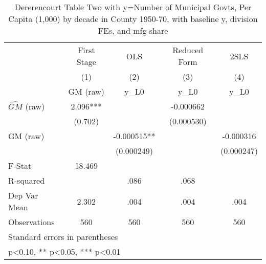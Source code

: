 \begin{table}[htbp]\centering
\def\sym#1{\ifmmode^{#1}\else\(^{#1}\)\fi}
\caption{Dererencourt Table Two with y=Number of Municipal Govts, Per Capita (1,000) by decade in County 1950-70, with baseline y, division FEs, and mfg share}
\begin{tabular}{l*{4}{c}}
\toprule
                    & First Stage   &         OLS   &Reduced Form   &        2SLS   \\
                    &\multicolumn{1}{c}{(1)}&\multicolumn{1}{c}{(2)}&\multicolumn{1}{c}{(3)}&\multicolumn{1}{c}{(4)}\\
                    &\multicolumn{1}{c}{GM  (raw)}&\multicolumn{1}{c}{y\_L0}&\multicolumn{1}{c}{y\_L0}&\multicolumn{1}{c}{y\_L0}\\
\midrule
$\hat{GM}$ (raw)    &       2.096***&               &   -0.000662   &               \\
                    &     (0.702)   &               &  (0.000530)   &               \\
\addlinespace
GM  (raw)           &               &   -0.000515** &               &   -0.000316   \\
                    &               &  (0.000249)   &               &  (0.000247)   \\
\midrule
F-Stat              &      18.469   &               &               &               \\
R-squared           &               &        .086   &        .068   &               \\
Dep Var Mean        &       2.302   &        .004   &        .004   &        .004   \\
Observations        &         560   &         560   &         560   &         560   \\
\bottomrule
\multicolumn{5}{l}{\footnotesize Standard errors in parentheses}\\
\multicolumn{5}{l}{\footnotesize * p<0.10, ** p<0.05, *** p<0.01}\\
\end{tabular}
\end{table}
